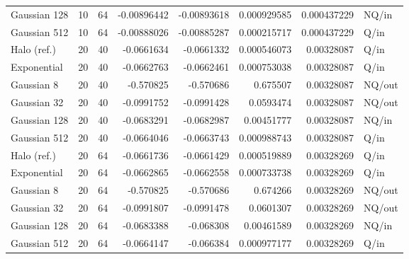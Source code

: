 \documentclass[fleqn,usenatbib]{mnras}
\begin{document}
\begin{table}
\begin{tabular}{lrrrrrrl}
Gaussian 128 & 10 & 64 & -0.00896442 & -0.00893618 & 0.000929585 & 0.000437229 & NQ/in \\
Gaussian 512 & 10 & 64 & -0.00888026 & -0.00885287 & 0.000215717 & 0.000437229 & Q/in \\
Halo (ref.) & 20 & 40 & -0.0661634 & -0.0661332 & 0.000546073 & 0.00328087 & Q/in \\
Exponential & 20 & 40 & -0.0662763 & -0.0662461 & 0.000753038 & 0.00328087 & Q/in \\
Gaussian 8 & 20 & 40 & -0.570825 & -0.570686 & 0.675507 & 0.00328087 & NQ/out \\
Gaussian 32 & 20 & 40 & -0.0991752 & -0.0991428 & 0.0593474 & 0.00328087 & NQ/out \\
Gaussian 128 & 20 & 40 & -0.0683291 & -0.0682987 & 0.00451777 & 0.00328087 & NQ/in \\
Gaussian 512 & 20 & 40 & -0.0664046 & -0.0663743 & 0.000988743 & 0.00328087 & Q/in \\
Halo (ref.) & 20 & 64 & -0.0661736 & -0.0661429 & 0.000519889 & 0.00328269 & Q/in \\
Exponential & 20 & 64 & -0.0662865 & -0.0662558 & 0.000733738 & 0.00328269 & Q/in \\
Gaussian 8 & 20 & 64 & -0.570825 & -0.570686 & 0.674266 & 0.00328269 & NQ/out \\
Gaussian 32 & 20 & 64 & -0.0991807 & -0.0991478 & 0.0601307 & 0.00328269 & NQ/out \\
Gaussian 128 & 20 & 64 & -0.0683388 & -0.068308 & 0.00461589 & 0.00328269 & NQ/in \\
Gaussian 512 & 20 & 64 & -0.0664147 & -0.066384 & 0.000977177 & 0.00328269 & Q/in \\
\bottomrule
\end{tabular}
\end{table}
\end{document}
